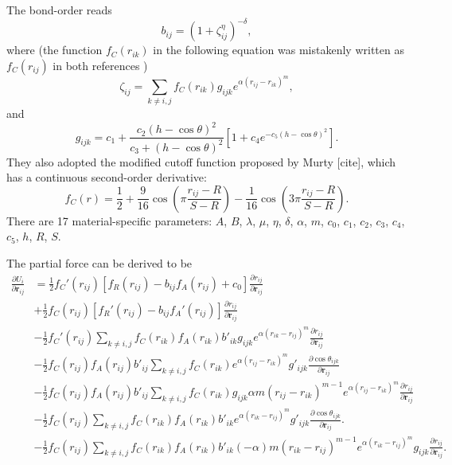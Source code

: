 \documentclass[12pt,a4paper]{report}
\newcommand{\vect}[1]{\boldsymbol{#1}}
\begin{document}
The bond-order reads
\begin{equation}
b_{ij} = \left(1 + \zeta_{ij}^{\eta}\right)^{-\delta},
\end{equation}
where (the function $f_C(r_{ik})$ in the following equation was mistakenly written as $f_C(r_{ij})$ in both references \cite{kumagai2007cms,pun2017prb})
\begin{equation}
\zeta_{ij} = \sum_{k\neq i, j}f_C(r_{ik}) g_{ijk} e^{\alpha (r_{ij} - r_{ik})^m},
\end{equation}
and
\begin{equation}
g_{ijk} = c_1 + \frac{c_2(h-\cos\theta)^2}{c_3+(h-\cos\theta)^2}
                \left[1+c_4e^{-c_5(h-\cos\theta)^2}\right].
\end{equation}
They also adopted the modified cutoff function proposed by
Murty [cite], which has a continuous second-order derivative:
\begin{equation}
f_{C}(r) = \frac{1}{2} +
\frac{9}{16} \cos \left( \pi \frac{r_{ij} - R}{S - R} \right) -
\frac{1}{16} \cos \left( 3\pi \frac{r_{ij} - R}{S - R} \right).
\end{equation}
There are 17 material-specific parameters: $A$, $B$, $\lambda$, $\mu$, $\eta$, $\delta$, $\alpha$, $m$, $c_0$, $c_1$, $c_2$, $c_3$, $c_4$, $c_5$, $h$, $R$, $S$.



The partial force can be derived to be
\begin{align}
\frac{\partial U_i}{\partial \vect{r}_{ij}}
&= \frac{1}{2}f_C'(r_{ij})[f_R(r_{ij})-b_{ij}f_A(r_{ij})+c_0]\frac{\partial r_{ij}}{\partial \vect{r}_{ij}} \nonumber \\
&+ \frac{1}{2}f_C(r_{ij})[f_R'(r_{ij})-b_{ij}f_A'(r_{ij})]\frac{\partial r_{ij}}{\partial \vect{r}_{ij}} \nonumber \\
&- \frac{1}{2}f_C'(r_{ij})\sum_{k\neq i,j}f_C(r_{ik})f_A(r_{ik})b'_{ik}g_{ijk} e^{\alpha (r_{ik}-r_{ij})^m}\frac{\partial r_{ij}}{\partial \vect{r}_{ij}} \nonumber \\
&- \frac{1}{2}f_C(r_{ij})f_A(r_{ij})b'_{ij}\sum_{k\neq i,j}f_C(r_{ik}) e^{\alpha (r_{ij}-r_{ik})^m} g'_{ijk}
   \frac{\partial \cos\theta_{ijk}}{\partial \vect{r}_{ij}} \nonumber \\
&- \frac{1}{2}f_C(r_{ij})f_A(r_{ij})b'_{ij}\sum_{k\neq i,j}f_C(r_{ik}) g_{ijk} \alpha m (r_{ij}-r_{ik})^{m-1} e^{\alpha (r_{ij}-r_{ik})^m}
   \frac{\partial r_{ij}}{\partial \vect{r}_{ij}} \nonumber \\
&- \frac{1}{2}f_C(r_{ij})\sum_{k\neq i,j}f_C(r_{ik})f_A(r_{ik})b'_{ik} e^{\alpha (r_{ik}-r_{ij})^m} g'_{ijk}
   \frac{\partial \cos\theta_{ijk}}{\partial \vect{r}_{ij}}. \nonumber \\
&- \frac{1}{2}f_C(r_{ij})\sum_{k\neq i,j}f_C(r_{ik})f_A(r_{ik})b'_{ik} (-\alpha) m (r_{ik}-r_{ij})^{m-1} e^{\alpha (r_{ik}-r_{ij})^m}
   g_{ijk} \frac{\partial r_{ij}}{\partial \vect{r}_{ij}}.
\end{align}
\end{document}
